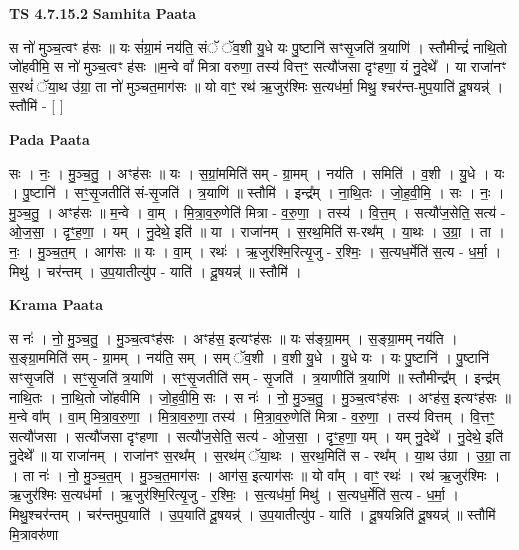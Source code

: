 \documentclass[17pt]{extarticle}
\begin{document}
\textbf{TS 4.7.15.2 } \newline
\textbf{Samhita Paata} \newline

स नो॑ मुञ्च॒त्वꣳ ह॑सः ॥ यः सं॑ग्रा॒मं नय॑ति॒ संॅ ॅव॒शी यु॒धे यः पु॒ष्टानि॑ सꣳसृ॒जति॑ त्र॒याणि॑ । स्तौमीन्द्रं॑ नाथि॒तो जो॑हवीमि॒ स नो॑ मुञ्च॒त्वꣳ ह॑सः ॥म॒न्वे वां᳚ मित्रा वरुणा॒ तस्य॑ वित्तꣳ॒॒ सत्यौ॑जसा दृꣳहणा॒ यं नु॒देथे᳚ । या राजा॑नꣳ स॒रथं॑ ॅया॒थ उ॑ग्रा॒ ता नो॑ मुञ्चत॒माग॑सः ॥ यो वाꣳ॒॒ रथ॑ ऋ॒जुर॑श्मिः स॒त्यध॑र्मा॒ मिथु॒ श्चर॑न्त-मुप॒याति॑ दू॒षयन्न्॑ । स्तौमि॑ - [  ] \newline

\textbf{Pada Paata} \newline

सः । नः॒ । मु॒ञ्च॒तु॒ । अꣳह॑सः ॥ यः । स॒ग्रां॒ममिति॑ सम् - ग्रा॒मम् । नय॑ति । समिति॑ । व॒शी । यु॒धे । यः । पु॒ष्टानि॑ । सꣳ॒॒सृ॒जतीति॑ सं-सृ॒जति॑ । त्र॒याणि॑ ॥ स्तौमि॑ । इन्द्र᳚म् । ना॒थि॒तः । जो॒ह॒वी॒मि॒ । सः । नः॒ । मु॒ञ्च॒तु॒ । अꣳह॑सः ॥ म॒न्वे । वा॒म् । मि॒त्रा॒व॒रु॒णेति॑ मित्रा - व॒रु॒णा॒ । तस्य॑ । वि॒त्त॒म् । सत्यौ॑ज॒सेति॒ सत्य॑ - ओ॒ज॒सा॒ । दृꣳ॒॒ह॒णा॒ । यम् । नु॒देथे॒ इति॑ ॥ या । राजा॑नम् । स॒रथ॒मिति॑ स-रथ᳚म् । या॒थः । उ॒ग्रा॒ । ता । नः॒ । मु॒ञ्च॒त॒म् । आग॑सः ॥ यः । वा॒म् । रथः॑ । ऋ॒जुर॑श्मि॒रित्यृ॒जु - र॒श्मिः॒ । स॒त्यध॒र्मेति॑ स॒त्य - ध॒र्मा॒ । मिथु॑ । चर॑न्तम् । उ॒प॒यातीत्यु॑प - याति॑ । दू॒षयन्न्॑ ॥ स्तौमि॑ ।  \newline


\textbf{Krama Paata} \newline

स नः॑ । नो॒ मु॒ञ्च॒तु॒ । मु॒ञ्च॒त्वꣳह॑सः । अꣳह॑स॒ इत्यꣳह॑सः ॥ यः स॑ङ्ग्रा॒मम् । स॒ङ्ग्रा॒मम् नय॑ति । स॒ङ्ग्रा॒ममिति॑ सम् - ग्रा॒मम् । नय॑ति॒ सम् । सम् ॅव॒शी । व॒शी यु॒धे । यु॒धे यः । यः पु॒ष्टानि॑ । पु॒ष्टानि॑ सꣳसृ॒जति॑ । सꣳ॒॒सृ॒जति॑ त्र॒याणि॑ । सꣳ॒॒सृ॒जतीति॑ सम् - सृ॒जति॑ । त्र॒याणीति॑ त्र॒याणि॑ ॥ स्तौमीन्द्र᳚म् । इन्द्र॑म् नाथि॒तः । ना॒थि॒तो जो॑हवीमि । जो॒ह॒वी॒मि॒ सः । स नः॑ । नो॒ मु॒ञ्च॒तु॒ । मु॒ञ्च॒त्वꣳह॑सः । अꣳह॑स॒ इत्यꣳह॑सः ॥ म॒न्वे वा᳚म् । वा॒म् मि॒त्रा॒व॒रु॒णा॒ । मि॒त्रा॒व॒रु॒णा॒ तस्य॑ । मि॒त्रा॒व॒रु॒णेति॑ मित्रा - व॒रु॒णा॒ । तस्य॑ वित्तम् । वि॒त्तꣳ॒॒ सत्यौ॑जसा । सत्यौ॑जसा दृꣳहणा । सत्यौ॑ज॒सेति॒ सत्य॑ - ओ॒ज॒सा॒ । दृꣳ॒॒ह॒णा॒ यम् । यम् नु॒देथे᳚ । नु॒देथे॒ इति॑ नु॒देथे᳚ ॥ या राजा॑नम् । राजा॑नꣳ स॒रथ᳚म् । स॒रथ॑म् ॅया॒थः । स॒रथ॒मिति॑ स - रथ᳚म् । या॒थ उ॑ग्रा । उ॒ग्रा॒ ता । ता नः॑ । नो॒ मु॒ञ्च॒त॒म् । मु॒ञ्च॒त॒माग॑सः । आग॑स॒ इत्याग॑सः ॥ यो वा᳚म् । वाꣳ॒॒ रथः॑ । रथ॑ ऋ॒जुर॑श्मिः । ऋ॒जुर॑श्मिः स॒त्यध॑र्मा । ऋ॒जुर॑श्मि॒रित्यृ॒जु - र॒श्मिः॒ । स॒त्यध॑र्मा॒ मिथु॑ । स॒त्यध॒र्मेति॑ स॒त्य - ध॒र्मा॒ । मिथु॒श्चर॑न्तम् । चर॑न्तमुप॒याति॑ । उ॒प॒याति॑ दू॒षयन्न्॑ । उ॒प॒यातीत्यु॑प - याति॑ । दू॒षयन्निति॑ दू॒षयन्न्॑ ॥ स्तौमि॑ मि॒त्रावरु॑णा \newline
\end{document}
